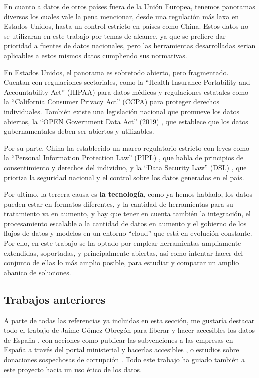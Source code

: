En cuanto a datos de otros países fuera de la Unión Europea, tenemos panoramas diversos los cuales vale la pena mencionar, desde una regulación más laxa en Estados Unidos, hasta un control estricto en países como China. Estos datos no se utilizaran en este trabajo por temas de alcance, ya que se prefiere dar prioridad a fuentes de datos nacionales, pero las herramientas desarrolladas serian aplicables a estos mismos datos cumpliendo sus normativas.

En Estados Unidos, el panorama es sobretodo abierto, pero fragmentado. Cuentan con regulaciones sectoriales, como la ``Health Insurance Portability and Accountability Act'' (HIPAA) para datos médicos \citep{webHIPAA1996EEUU} y regulaciones estatales como la ``California Consumer Privacy Act'' (CCPA) \citep{webCCPA2018California} para proteger derechos individuales. También existe una legislación nacional que promueve los datos abiertos, la ``OPEN Government Data Act'' (2019) \citep{webOGDA2019EEUU}, que establece que los datos gubernamentales deben ser abiertos y utilizables.

Por su parte, China ha establecido un marco regulatorio estricto con leyes como la ``Personal Information Protection Law'' (PIPL) \citep{webPIPL2021China}, que habla de principios de consentimiento y derechos del individuo, y la ``Data Security Law'' (DSL) \citep{webDSL2021China}, que prioriza la seguridad nacional y el control sobre los datos generados en el país.


Por ultimo, la tercera causa es \textbf{la tecnología}, como ya hemos hablado, los datos pueden estar en formatos diferentes, y la cantidad de herramientas para su tratamiento va en aumento, y hay que tener en cuenta también la integración, el procesamiento escalable a la cantidad de datos en aumento y el gobierno de los flujos de datos y modelos en un entorno ``cloud'' que está en evolución constante. Por ello, en este trabajo se ha optado por emplear herramientas ampliamente extendidas, soportadas, y principalmente abiertas, así como intentar hacer del conjunto de ellas lo más amplio posible, para estudiar y comparar un amplio abanico de soluciones.

	\subsection{Trabajos anteriores}
	
	A parte de todas las referencias ya incluidas en esta sección, me gustaría destacar todo el trabajo de Jaime Gómez-Obregón para liberar y hacer accesibles los datos de España \citep{JaimeGomezObregon}, con acciones como publicar las subvenciones a las empresas en España a través del portal ministerial y hacerlas accesibles  \citep{JaimeGomezObregonSubvenciones}, o estudios sobre donaciones sospechosas de corrupción \citep{JaimeGomezObregonDonacion}. Todo este trabajo ha guiado también a este proyecto hacia un uso ético de los datos.
	
